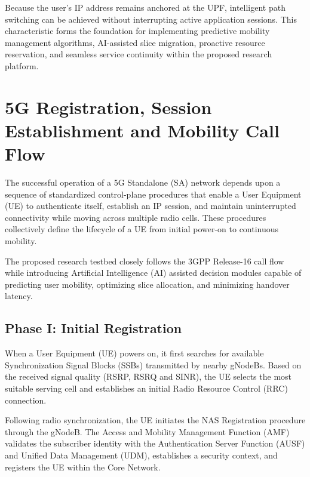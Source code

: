 \documentclass[12pt,a4paper]{article}\usepackage[a4paper,margin=1in]{geometry}\usepackage{graphicx}\usepackage{longtable}\usepackage{booktabs}\usepackage{hyperref}\usepackage{enumitem}\usepackage{amsmath}\usepackage{tikz}\usepackage{pgfgantt}\usepackage{setspace}\setstretch{1.15}\usetikzlibrary{positioning,arrows.meta,shapes.geometric}
\begin{document}
	Because the user's IP address remains anchored at the UPF, intelligent path switching can be achieved without interrupting active application sessions. This characteristic forms the foundation for implementing predictive mobility management algorithms, AI-assisted slice migration, proactive resource reservation, and seamless service continuity within the proposed research platform.
	
	\section{5G Registration, Session Establishment and Mobility Call Flow}
	
	The successful operation of a 5G Standalone (SA) network depends upon a sequence of standardized control-plane procedures that enable a User Equipment (UE) to authenticate itself, establish an IP session, and maintain uninterrupted connectivity while moving across multiple radio cells. These procedures collectively define the lifecycle of a UE from initial power-on to continuous mobility.
	
	The proposed research testbed closely follows the 3GPP Release-16 call flow while introducing Artificial Intelligence (AI) assisted decision modules capable of predicting user mobility, optimizing slice allocation, and minimizing handover latency.
	
	
	\subsection{Phase I: Initial Registration}
	
	When a User Equipment (UE) powers on, it first searches for available Synchronization Signal Blocks (SSBs) transmitted by nearby gNodeBs. Based on the received signal quality (RSRP, RSRQ and SINR), the UE selects the most suitable serving cell and establishes an initial Radio Resource Control (RRC) connection.
	
	Following radio synchronization, the UE initiates the NAS Registration procedure through the gNodeB. The Access and Mobility Management Function (AMF) validates the subscriber identity with the Authentication Server Function (AUSF) and Unified Data Management (UDM), establishes a security context, and registers the UE within the Core Network.
	
\end{document}
